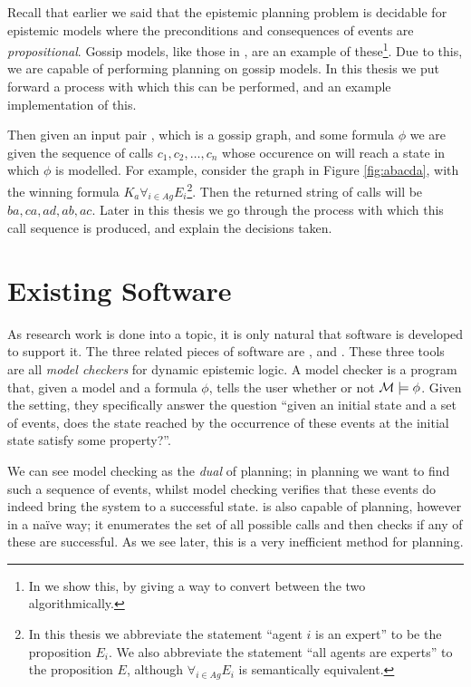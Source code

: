 \documentclass[10pt, a4paper]{report}
\begin{document}
Recall that earlier we said that the epistemic planning problem is decidable for
epistemic models where the preconditions and consequences of events are
\emph{propositional}. Gossip models, like those in ,
are an example of these\footnote{In  we show this, by
giving a way to convert between the two algorithmically.}. Due to this, we are
capable of performing planning on gossip models. In this thesis we put forward a
process with which this can be performed, and an example implementation of this.

Then given an input pair , which is a gossip graph, and some formula
$\phi$ we are given the sequence of calls $c_1, c_2, \ldots, c_n$ whose
occurence on  will reach a state in which $\phi$ is modelled. For
example, consider the graph in Figure \ref{fig:abacda}, with the winning formula
$K_a \forall_{i \in Ag} E_i$\footnote{In this thesis we abbreviate the statement
  ``agent $i$ is an expert'' to be the proposition $E_i$. We also abbreviate the
  statement ``all agents are experts'' to the proposition $E$, although
  $\forall_{i \in Ag}E_i$ is semantically equivalent.}. Then the returned string
of calls will be $ba, ca, ad, ab, ac$. Later in this thesis we go through the
process with which this call sequence is produced, and explain the decisions
taken.

\section{Existing Software}

As research work is done into a topic, it is only natural that software is
developed to support it. The three related pieces of software are
\cite{DEMO-S5}, \cite{SMCDEL} and \cite{GithubGossip}. These three tools are all
\emph{model checkers} for dynamic epistemic logic. A model checker is a
program that, given a model  and a formula $\phi$, tells the user whether
or not $\mathcal{M} \models \phi$. Given the setting, they specifically answer the
question ``given an initial state and a set of events, does the state reached by
the occurrence of these events at the initial state satisfy some property?''.

We can see model checking as the \emph{dual} of planning; in planning we want
to find such a sequence of events, whilst model checking verifies that these
events do indeed bring the system to a successful state. \cite{GithubGossip} is
also capable of planning, however in a na{\"i}ve way; it enumerates the set of
all possible calls and then checks if any of these are successful. As we see
later, this is a very inefficient method for planning.  
\end{document}
